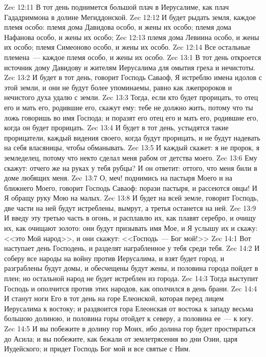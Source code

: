 \vs Zec 12:11 В тот день поднимется большой плач в Иерусалиме, как плач Гададриммона в долине Мегиддонской.
\vs Zec 12:12 И будет рыдать земля, каждое племя особо: племя дома Давидова особо, и жены их особо; племя дома Нафанова особо, и жены их особо;
\vs Zec 12:13 племя дома Левиина особо, и жены их особо; племя Симеоново особо, и жены их особо.
\vs Zec 12:14 Все остальные племена~--- каждое племя особо, и жены их особо.
\vs Zec 13:1 В тот день откроется источник дому Давидову и жителям Иерусалима для омытия греха и нечистоты.
\vs Zec 13:2 И будет в тот день, говорит Господь Саваоф, Я истреблю имена идолов с этой земли, и они не будут более упоминаемы, равно как лжепророков и нечистого духа удалю с земли.
\vs Zec 13:3 Тогда, если кто будет прорицать, то отец его и мать его, родившие его, скажут ему: тебе не должно жить, потому что ты ложь говоришь во имя Господа; и поразят его отец его и мать его, родившие его, когда он будет прорицать.
\vs Zec 13:4 И будет в тот день, устыдятся такие прорицатели, каждый видения своего, когда будут прорицать, и не будут надевать на себя власяницы, чтобы обманывать.
\vs Zec 13:5 И каждый скажет: я не пророк, я земледелец, потому что некто сделал меня рабом от детства моего.
\vs Zec 13:6 Ему скажут: отчего же на руках у тебя рубцы? И он ответит: оттого, что меня били в доме любящих меня.
\vs Zec 13:7 О, меч! поднимись на пастыря Моего и на ближнего Моего, говорит Господь Саваоф: порази пастыря, и рассеются овцы! И Я обращу руку Мою на малых.
\vs Zec 13:8 И будет на всей земле, говорит Господь, две части на ней будут истреблены, вымрут, а третья останется на ней.
\vs Zec 13:9 И введу эту третью часть в огонь, и расплавлю их, как плавят серебро, и очищу их, как очищают золото: они будут призывать имя Мое, и Я услышу их и скажу: <<это Мой народ>>, и они скажут: <<Господь~--- Бог мой!>>
\vs Zec 14:1 Вот наступает день Господень, и разделят награбленное у тебя среди тебя.
\vs Zec 14:2 И соберу все народы на войну против Иерусалима, и взят будет город, и разграблены будут домы, и обесчещены будут жены, и половина города пойдет в плен; но остальной народ не будет истреблен из города.
\vs Zec 14:3 Тогда выступит Господь и ополчится против этих народов, как ополчился в день брани.
\vs Zec 14:4 И станут ноги Его в тот день на горе Елеонской, которая перед лицем Иерусалима к востоку; и раздвоится гора Елеонская от востока к западу весьма большою долиною, и половина горы отойдет к северу, а половина ее~--- к югу.
\vs Zec 14:5 И вы побежите в долину гор Моих, ибо долина гор будет простираться до Асила; и вы побежите, как бежали от землетрясения во дни Озии, царя Иудейского; и придет Господь Бог мой и все святые с Ним.
